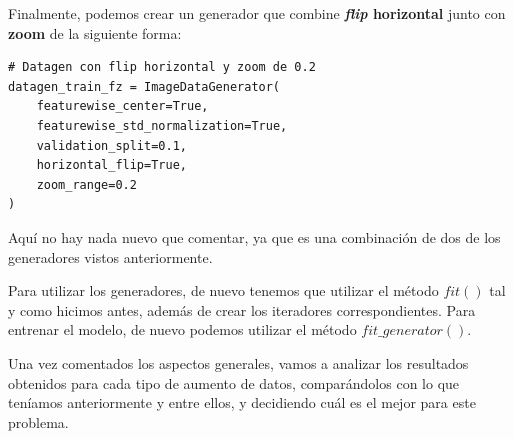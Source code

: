 \documentclass[11pt,a4paper]{article}
\begin{document}
Finalmente, podemos crear un generador que combine \textbf{\textit{flip} horizontal} junto con \textbf{zoom} de la
siguiente forma:

\begin{lstlisting}
# Datagen con flip horizontal y zoom de 0.2
datagen_train_fz = ImageDataGenerator(
    featurewise_center=True,
    featurewise_std_normalization=True,
    validation_split=0.1,
    horizontal_flip=True,
    zoom_range=0.2
)
\end{lstlisting}

Aquí no hay nada nuevo que comentar, ya que es una combinación de dos de los generadores vistos anteriormente.

Para utilizar los generadores, de nuevo tenemos que utilizar el método $fit()$ tal y como hicimos antes, además de crear
los iteradores correspondientes. Para entrenar el modelo, de nuevo podemos utilizar el método $fit\_generator()$.

Una vez comentados los aspectos generales, vamos a analizar los resultados obtenidos para cada tipo de aumento de datos,
comparándolos con lo que teníamos anteriormente y entre ellos, y decidiendo cuál es el mejor para este problema.
\end{document}
